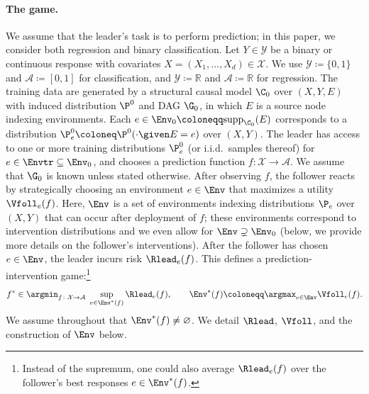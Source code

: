 \paragraph{The game.}
We assume that the leader's task is to perform prediction; in this paper, we
consider both regression and binary classification.
Let $Y \in \mathcal{Y}$ be a binary or continuous response with covariates $X = (X_1, \ldots, X_d) \in \mathcal{X}$.
We use $\mathcal{Y} \coloneqq \{0,1\}$ and $\mathcal{A} \coloneqq [0,1]$ for classification, and $\mathcal{Y} \coloneqq \mathbb{R}$ and $\mathcal{A} \coloneqq \mathbb{R}$ for regression. The training data are generated by a structural causal model
\citep[SCM;][]{pearlCausalityModelsReasoning2009, bongersFoundationsStructuralCausal2021}
$\C_0$ over $(X, Y, E)$ with induced distribution $\P^0$ and DAG $\G_0$, in which $E$ is a source node indexing environments. Each $e \in \Env_0 \coloneqq \mathrm{supp}_{\C_0}(E)$
corresponds to a distribution $\P^0_e \coloneq \P^0(\cdot \given E=e)$ over $(X, Y)$. The leader has access
to one or more training distributions $\P^0_e$ (or i.i.d.\ samples thereof) for $e \in \Envtr \subseteq \Env_0$, and chooses a
prediction function $f \colon \mathcal{X} \to \mathcal{A}$. We assume that
$\G_0$ is known unless stated otherwise. After observing $f$, the follower reacts by strategically choosing an
environment $e \in \Env$ that maximizes a utility $\Vfoll_e(f)$. Here,
$\Env$ 
is a set of
environments indexing distributions $\P_e$ over
$(X, Y)$ 
that can occur after deployment of $f$; 
these environments correspond to intervention distributions
and we even allow for 
$\Env \supsetneq \Env_0$
(below, we provide more details on the follower's interventions). After the follower has chosen $e \in \Env$, the leader incurs risk $\Rlead_e(f)$. This defines a prediction-intervention game:\footnote{Instead of the
supremum, one could also average $\Rlead_e(f)$ over the follower's best
responses $e \in \Env^*(f)$.}
\begin{equation} \label{eq:pred_intervention_game}
    f^* \in \argmin_{f \colon \mathcal{X} \to \mathcal{A}}\;
    \sup_{e \in \Env^*(f)} \Rlead_e(f),
    \qquad
    \Env^*(f) \coloneqq \argmax_{e \in \Env} \Vfoll_e(f).
\end{equation}
We assume throughout that $\Env^*(f) \neq \varnothing$. We detail $\Rlead$, $\Vfoll$, and the construction of $\Env$ below.




